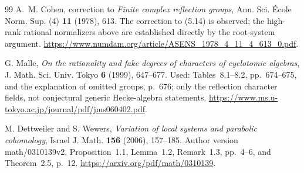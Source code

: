\documentclass[11pt]{article}
\theoremstyle{definition}
\theoremstyle{remark}
\begin{document}
\begin{thebibliography}{99}
A.~M. Cohen, correction to \emph{Finite complex reflection groups},
Ann. Sci. \'Ecole Norm. Sup. (4) \textbf{11} (1978), 613.
The correction to (5.14) is observed; the high-rank rational normalizers
above are established directly by the root-system argument.
\url{https://www.numdam.org/article/ASENS_1978_4_11_4_613_0.pdf}.

G. Malle, \emph{On the rationality and fake degrees of characters of
cyclotomic algebras}, J. Math. Sci. Univ. Tokyo \textbf{6} (1999),
647--677. Used: Tables~8.1--8.2, pp.~674--675, and the explanation of
omitted groups, p.~676; only the reflection character fields, not
conjectural generic Hecke-algebra statements.
\url{https://www.ms.u-tokyo.ac.jp/journal/pdf/jms060402.pdf}.

M. Dettweiler and S. Wewers, \emph{Variation of local systems and
parabolic cohomology}, Israel J. Math. \textbf{156} (2006), 157--185.
Author version math/0310139v2, Proposition~1.1, Lemma~1.2,
Remark~1.3, pp.~4--6, and Theorem~2.5, p.~12.
\url{https://arxiv.org/pdf/math/0310139}.


\end{thebibliography}
\end{document}
